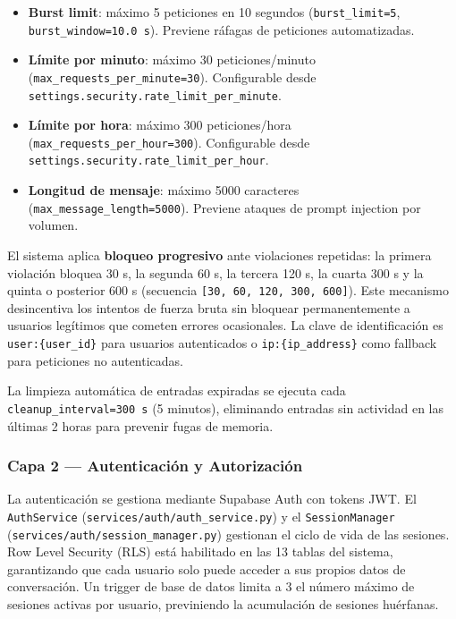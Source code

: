 \begin{itemize}[nosep, leftmargin=*]
  \item \textbf{Burst limit}: máximo 5 peticiones en 10 segundos (\texttt{burst\_limit=5}, \texttt{burst\_window=10.0 s}). Previene ráfagas de peticiones automatizadas.
  \item \textbf{Límite por minuto}: máximo 30 peticiones/minuto (\texttt{max\_requests\_per\_minute=30}). Configurable desde \texttt{settings.security.rate\_limit\_per\_minute}.
  \item \textbf{Límite por hora}: máximo 300 peticiones/hora (\texttt{max\_requests\_per\_hour=300}). Configurable desde \texttt{settings.security.rate\_limit\_per\_hour}.
  \item \textbf{Longitud de mensaje}: máximo 5000 caracteres (\texttt{max\_message\_length=5000}). Previene ataques de prompt injection por volumen.
\end{itemize}

El sistema aplica \textbf{bloqueo progresivo} ante violaciones repetidas: la primera violación bloquea 30 s, la segunda 60 s, la tercera 120 s, la cuarta 300 s y la quinta o posterior 600 s (secuencia \texttt{[30, 60, 120, 300, 600]}). Este mecanismo desincentiva los intentos de fuerza bruta sin bloquear permanentemente a usuarios legítimos que cometen errores ocasionales. La clave de identificación es \texttt{user:\{user\_id\}} para usuarios autenticados o \texttt{ip:\{ip\_address\}} como fallback para peticiones no autenticadas.

La limpieza automática de entradas expiradas se ejecuta cada \texttt{cleanup\_interval=300 s} (5 minutos), eliminando entradas sin actividad en las últimas 2 horas para prevenir fugas de memoria.

\subsubsection{Capa 2 — Autenticación y Autorización}

La autenticación se gestiona mediante Supabase Auth con tokens JWT. El \texttt{AuthService} (\texttt{services/auth/auth\_service.py}) y el \texttt{SessionManager} (\texttt{services/auth/session\_manager.py}) gestionan el ciclo de vida de las sesiones. Row Level Security (RLS) está habilitado en las 13 tablas del sistema, garantizando que cada usuario solo puede acceder a sus propios datos de conversación. Un trigger de base de datos limita a 3 el número máximo de sesiones activas por usuario, previniendo la acumulación de sesiones huérfanas.

